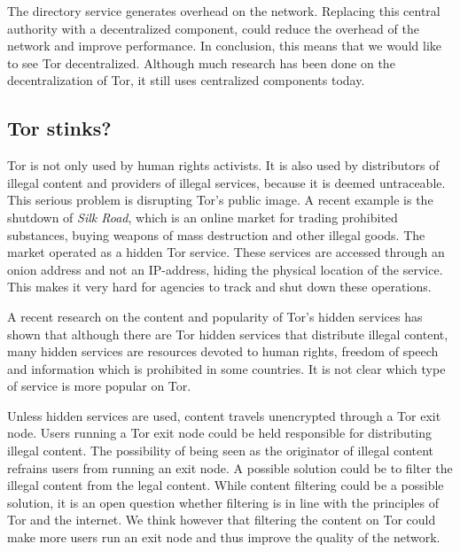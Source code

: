 \documentclass{article}
\begin{document}
		The directory service generates overhead on the network. Replacing this central authority with a decentralized component, could reduce the overhead of the network and improve performance. In conclusion, this means that we would like to see Tor decentralized. Although much research has been done on the decentralization of Tor, it still uses centralized components today.

		\subsection{Tor stinks?}
			Tor is not only used by human rights activists. It is also used by distributors of illegal content and providers of illegal services, because it is deemed untraceable. This serious problem is disrupting Tor's public image. A recent example is the shutdown of \emph{Silk Road}, which is an online market for trading prohibited substances, buying weapons of mass destruction and other illegal goods. The market operated as a hidden Tor service. These services are accessed through an onion address and not an IP-address, hiding the physical location of the service. This makes it very hard for agencies to track and shut down these operations.

			A recent research on the content and popularity of Tor's hidden services \cite{biryukov2013content} has shown that although there are Tor hidden services that distribute illegal content, many hidden services are resources devoted to human rights, freedom of speech and information which is prohibited in some countries. It is not clear which type of service is more popular on Tor.

			Unless hidden services are used, content travels unencrypted through a Tor exit node. Users running a Tor exit node could be held responsible for distributing illegal content. The possibility of being seen as the originator of illegal content refrains users from running an exit node. A possible solution could be to filter the illegal content from the legal content. While content filtering could be a possible solution, it is an open question whether filtering is in line with the principles of Tor and the internet. We think however that filtering the content on Tor could make more users run an exit node and thus improve the quality of the network.
		
\end{document}
